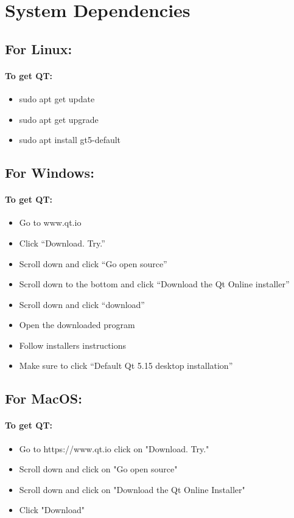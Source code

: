 \chapter{System Dependencies}
  \section{For Linux:}
  \subsubsection*{To get QT:}
    \begin{itemize}
      \item sudo apt get update
      \item sudo apt get upgrade
      \item sudo apt install gt5-default
    \end{itemize}

  \bigskip
  \section{For Windows:}
  \subsubsection*{To get QT:}
    \begin{itemize}
      \item Go to www.qt.io
      \item Click “Download. Try.”
      \item Scroll down and click “Go open source”
      \item Scroll down to the bottom and click “Download the Qt Online installer”
      \item Scroll down and click “download”
      \item Open the downloaded program
      \item Follow installers instructions
      \item Make sure to click “Default Qt 5.15 desktop installation”
    \end{itemize}

  \bigskip
  \section{For MacOS:}
  \subsubsection*{To get QT:}
    \begin{itemize}
      \item Go to https://www.qt.io click on "Download. Try."
      \item Scroll down and click on "Go open source"
      \item Scroll down and click on "Download the Qt Online Installer"
      \item Click "Download"
    \end{itemize}
